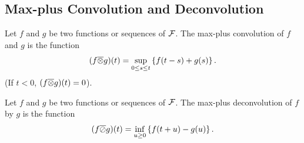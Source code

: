 \subsection{Max-plus Convolution and Deconvolution}

\begin{definition}
Let $f$ and $g$ be two functions or sequences of $\mathcal F$. The max-plus convolution of $f$ and $g$
is the function
\begin{equation}
\mylabel{eq:maxplusconvolution}
(f \overline{ \otimes } g)(t) = \sup_{0 \leq s \leq t} \left\{ f(t-s) + g(s) \right\}.
\end{equation}
(If $t < 0$,  $(f \overline{\otimes} g)(t) = 0$).
\end{definition}
\begin{definition}
Let $f$ and $g$ be two functions or sequences of $\mathcal F$. The max-plus deconvolution of $f$ by $g$
is the function
\begin{equation}
\mylabel{eq:maxplusdeconvolution}
(f \overline{ \oslash } g)(t) = \inf_{u \geq 0} \left\{ f(t+u) - g(u) \right\}.
\end{equation}
\end{definition}

